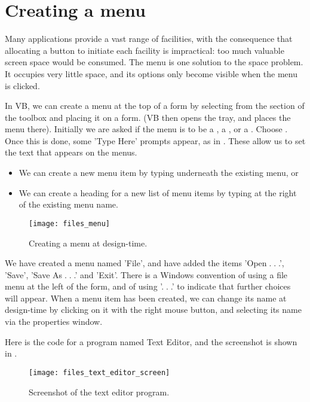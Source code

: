 	\section{Creating a menu}
		Many applications provide a vast range of facilities, with the consequence that allocating a button to initiate each facility is impractical: too much valuable screen space would be consumed. The menu is one solution to the space problem. It occupies very little space, and its options only become visible when the menu is clicked.
		
		In VB, we can create a menu at the top of a form by selecting  from the  section of the toolbox and placing it on a form. (VB then opens the  tray, and places the menu there). Initially we are asked if the menu is to be a , a , or a . Choose . Once this is done, some 'Type Here' prompts appear, as in . These allow us to set the text that appears on the menus.
	 	\begin{itemize}
      \item We can create a new menu item by typing underneath the existing menu, or
      \item We can create a heading for a new list of menu items by typing at the right of the existing menu name.
		\end{itemize}
		\begin{figure}[tbh]
			\centering
			\texttt{[image: files\_menu]}
			\caption{Creating a menu at design-time.}
			\label{fig:files_menu}
		\end{figure}

		We have created a menu named 'File', and have added the items 'Open . . .', 'Save', 'Save As . . .' and 'Exit'. There is a Windows convention of using a file menu at the left of the form, and of using '. . .' to indicate that further choices will appear. When a menu item has been created, we can change its name at design-time by clicking on it with the right mouse button, and selecting its name via the properties window. 
		
		Here is the code for a program named Text Editor, and the screenshot is shown in .
		\begin{figure}[tbh]
			\centering
			\texttt{[image: files\_text\_editor\_screen]}
			\caption{Screenshot of the text editor program.}
			\label{fig:files_text_editor_screen}
		\end{figure}


